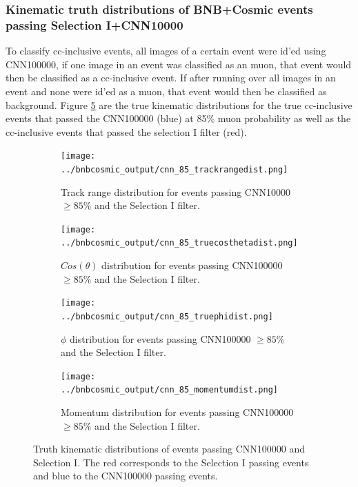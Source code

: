 \subsubsection{Kinematic truth distributions of BNB+Cosmic events passing Selection I+CNN10000}
To classify cc-inclusive events, all images of a certain event were id'ed using CNN100000, if one image in an event was classified as an muon, that event would then be classified as a cc-inclusive event. If after running over all images in an event and none were id'ed as a muon, that event would then be classified as background. Figure \ref{fig:truthkinematics} are the true kinematic distributions for the true cc-inclusive events that passed the CNN100000 (blue) at 85\% muon probability as well as the cc-inclusive events that passed the selection I filter (red).  

\begin{figure}[htp!]
\centering
	\begin{subfigure}[b]{.475\textwidth}
	\centering
		\texttt{[image: ../bnbcosmic\_output/cnn\_85\_trackrangedist.png]}
		\caption{Track range distribution for events passing CNN10000 $\geq 85\%$ and the Selection I filter.} 
		\label{fig:cnn85trackrange}
	\end{subfigure}
	\quad
	\begin{subfigure}[b]{.475\textwidth}
	\centering
		\texttt{[image: ../bnbcosmic\_output/cnn\_85\_truecosthetadist.png]}
		\caption{$Cos(\theta)$ distribution for events passing CNN100000 $\geq 85\%$ and the Selection I filter.} 
		\label{fig:cnn85costheta}
	\end{subfigure}
	\quad
	\begin{subfigure}[b]{.475\textwidth}
	\centering
		\texttt{[image: ../bnbcosmic\_output/cnn\_85\_truephidist.png]}
		\caption{$\phi$ distribution for events passing CNN100000 $\geq 85\%$ and the Selection I filter.} 
		\label{fig:cnn85phi}
	\end{subfigure}
	\quad
	\begin{subfigure}[b]{.475\textwidth}
	\centering
		\texttt{[image: ../bnbcosmic\_output/cnn\_85\_momentumdist.png]}
		\caption{Momentum distribution for events passing CNN100000 $\geq 85 \%$ and the Selection I filter.} 
		\label{fig:cnn85momentum}
	\end{subfigure}
\caption{Truth kinematic distributions of events passing CNN100000 and Selection I. The red corresponds to the Selection I passing events and blue to the CNN100000 passing events.}
\label{fig:truthkinematics}
\end{figure}


